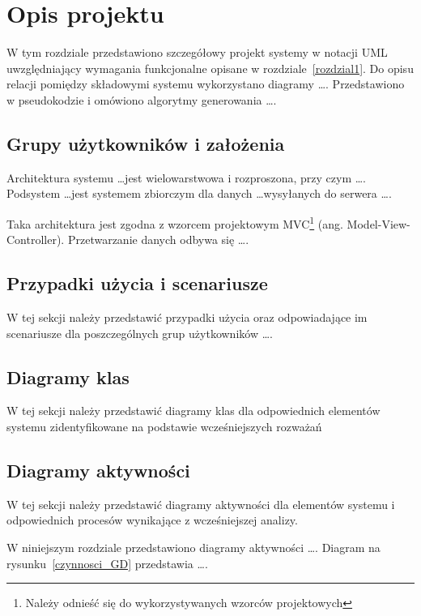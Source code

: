 \chapter{Opis projektu}
\thispagestyle{chapterBeginStyle}

\iffalse
{\color{dgray}
W tym rozdziale przedstawiono szczegółowy projekt systemy w notacji UML uwzględniający wymagania funkcjonalne opisane w rozdziale~\ref{rozdzial1}. Do opisu relacji pomiędzy składowymi systemu wykorzystano diagramy \ldots.
Przedstawiono w pseudokodzie i omówiono algorytmy generowania \ldots.
}


\section{Grupy użytkowników i założenia}

{\color{dgray}
Architektura systemu \ldots jest wielowarstwowa i rozproszona, przy czym \ldots. Podsystem  \ldots jest systemem zbiorczym dla danych \ldots wysyłanych do serwera \ldots. 

Taka architektura jest zgodna z wzorcem projektowym MVC\footnote{Należy odnieść się do wykorzystywanych wzorców projektowych} (ang.  Model-View-Controller). Przetwarzanie danych odbywa się \ldots.
} 

\section{Przypadki użycia i scenariusze}

W tej sekcji należy przedstawić przypadki użycia oraz odpowiadające im scenariusze dla poszczególnych grup użytkowników \ldots.

\section{Diagramy klas}

W tej sekcji należy przedstawić diagramy klas dla odpowiednich elementów systemu zidentyfikowane na podstawie wcześniejszych rozważań 

\section{Diagramy aktywności}

W tej sekcji należy przedstawić diagramy aktywności dla elementów systemu i odpowiednich procesów wynikające z wcześniejszej analizy.  

{\color{dgray}
W niniejszym rozdziale przedstawiono diagramy aktywności \ldots. Diagram na rysunku~\ref{czynnosci_GD} przedstawia \ldots.
} 

